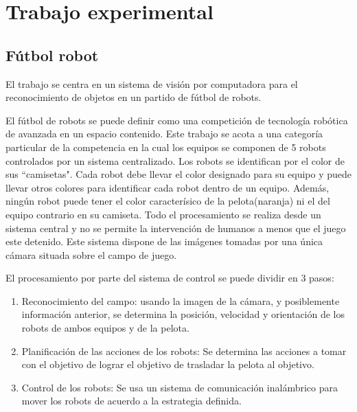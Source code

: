 \documentclass[a4paper,10pt]{report}
\begin{document}








\chapter{Trabajo experimental}
\section{Fútbol robot}
El trabajo se centra en un sistema de visión por computadora para el reconocimiento de objetos en un partido de fútbol de robots.

El fútbol de robots se puede definir como una competición de tecnología robótica de avanzada en un espacio contenido.
Este trabajo se acota a una categoría particular de la competencia en la cual los equipos se componen de 5 robots controlados por un sistema centralizado. 
Los robots se identifican por el color de sus ``camisetas". Cada robot debe llevar el color designado para su equipo y puede llevar otros colores para identificar cada robot dentro de un equipo.
Además, ningún robot puede tener el color caracterísico de la pelota(naranja) ni el del equipo contrario en su camiseta.
Todo el procesamiento se realiza desde un sistema central y no se permite la intervención de humanos a menos que el juego este detenido.
Este sistema dispone de las imágenes tomadas por una única cámara situada sobre el campo de juego.

El procesamiento por parte del sistema de control se puede dividir en 3 pasos:
\begin{enumerate}
 \item Reconocimiento del campo: usando la imagen de la cámara, y posiblemente información anterior, se determina la posición, velocidad y orientación de los robots de ambos equipos y de la pelota.
 \item Planificación de las acciones de los robots: Se determina las acciones a tomar con el objetivo de lograr el objetivo de trasladar la pelota al objetivo.
 \item Control de los robots: Se usa un sistema de comunicación inalámbrico para mover los robots de acuerdo a la estrategia definida.
\end{enumerate}
\end{document}
